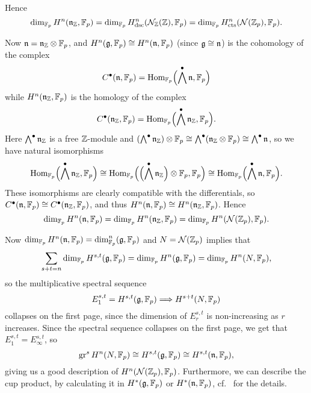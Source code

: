 Hence
\begin{equation*}
  \dim_{\mathbb{F}_p} H^{n}(\mathfrak{n}_{\mathbb{Z}},\mathbb{F}_p) = \dim_{\mathbb{F}_p} H_{\mathrm{dsc}}^n(\mathcal{N}_{\mathbb{Z}}(\mathbb{Z}),\mathbb{F}_p)= \dim_{\mathbb{F}_p} H_{\mathrm{cts}}^{n}(\mathcal{N}(\mathbb{Z}_p),\mathbb{F}_p).
\end{equation*}

Now $\mathfrak{n} = \mathfrak{n}_{\mathbb{Z}} \otimes \mathbb{F}_p$, and $H^n(\mathfrak{g},\mathbb{F}_p) \cong H^{n}(\mathfrak{n},\mathbb{F}_p)$ (since $\mathfrak{g} \cong \mathfrak{n}$) is the cohomology of the complex
\begin{equation*}
  C^\bullet(\mathfrak{n},\mathbb{F}_p) = \operatorname{Hom}_{\mathbb{F}_p}\Bigl( \bigwedge^\bullet \mathfrak{n},\mathbb{F}_p \Bigr)
\end{equation*}
while $H^{n}(\mathfrak{n}_{\mathbb{Z}},\mathbb{F}_p)$ is the homology of the complex
\begin{equation*}
  C^\bullet(\mathfrak{n}_{\mathbb{Z}},\mathbb{F}_p) = \operatorname{Hom}_{\mathbb{F}_p}\Bigl( \bigwedge^\bullet \mathfrak{n}_{\mathbb{Z}},\mathbb{F}_p \Bigr).
\end{equation*}
Here $\bigwedge^\bullet \mathfrak{n}_{\mathbb{Z}}$ is a free $\mathbb{Z}$-module and $(\bigwedge^\bullet \mathfrak{n}_{\mathbb{Z}}) \otimes \mathbb{F}_p \cong \bigwedge^\bullet (\mathfrak{n}_{\mathbb{Z}} \otimes \mathbb{F}_p) \cong \bigwedge^\bullet \mathfrak{n}$, so we have natural isomorphisms
\begin{equation*}
  \operatorname{Hom}_{\mathbb{F}_p}\Bigl( \bigwedge^\bullet \mathfrak{n}_{\mathbb{Z}},\mathbb{F}_p \Bigr) \cong \operatorname{Hom}_{\mathbb{F}_p}\Bigl( \Bigl( \bigwedge^\bullet \mathfrak{n}_{\mathbb{Z}} \Bigr) \otimes \mathbb{F}_p, \mathbb{F}_p \Bigr) \cong \operatorname{Hom}_{\mathbb{F}_p}\Bigl( \bigwedge^\bullet \mathfrak{n},\mathbb{F}_p \Bigr).
\end{equation*}
These isomorphisms are clearly compatible with the differentials, so $C^\bullet(\mathfrak{n},\mathbb{F}_p) \cong C^\bullet(\mathfrak{n}_{\mathbb{Z}},\mathbb{F}_p)$, and thus $H^n(\mathfrak{n},\mathbb{F}_p) \cong H^n(\mathfrak{n}_{\mathbb{Z}},\mathbb{F}_p)$. Hence
\begin{equation*}
  \dim_{\mathbb{F}_p} H^n(\mathfrak{n},\mathbb{F}_p) = \dim_{\mathbb{F}_p} H^n(\mathfrak{n}_{\mathbb{Z}},\mathbb{F}_p) = \dim_{\mathbb{F}_p} H^{n}(\mathcal{N}(\mathbb{Z}_p),\mathbb{F}_p).
\end{equation*}

Now $\dim_{\mathbb{F}_{p}} H^{n}(\mathfrak{n},\mathbb{F}_{p}) = \dim_{\mathbb{F}_{p}}^{n}(\mathfrak{g},\mathbb{F}_{p})$ and $N = \mathcal{N}(\mathbb{Z}_{p})$ implies that
\begin{equation*}
  \sum_{s+t = n} \dim_{\mathbb{F}_p} H^{s,t}(\mathfrak{g},\mathbb{F}_p) = \dim_{\mathbb{F}_p} H^n(\mathfrak{g},\mathbb{F}_p) = \dim_{\mathbb{F}_p} H^n(N,\mathbb{F}_p),
\end{equation*}
so the multiplicative spectral sequence
\begin{equation*}
  E_{1}^{s,t} = H^{s,t}(\mathfrak{g},\mathbb{F}_p) \Longrightarrow H^{s+t}(N,\mathbb{F}_p)
\end{equation*}
collapses on the first page, since the dimension of $E_{r}^{s,t}$ is non-increasing as $r$ increases. Since the spectral sequence collapses on the first page, we get that $E_{1}^{s,t} = E_{\infty}^{s,t}$, so
\begin{equation*}
  \operatorname{gr}^{s} H^{n}(N,\mathbb{F}_p) \cong H^{s,t}(\mathfrak{g},\mathbb{F}_p) \cong H^{s,t}(\mathfrak{n},\mathbb{F}_p),
\end{equation*}
giving us a good description of $H^n(\mathcal{N}(\mathbb{Z}_p),\mathbb{F}_p)$. Furthermore, we can describe the cup product, by calculating it in $H^{*}(\mathfrak{g},\mathbb{F}_{p})$ or $H^{*}(\mathfrak{n},\mathbb{F}_{p})$, cf.\  for the details.


